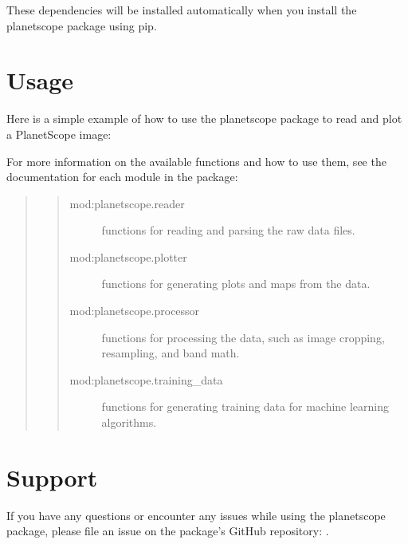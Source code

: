 \documentclass[letterpaper,10pt,english]{sphinxmanual}
\begin{document}
\sphinxAtStartPar
These dependencies will be installed automatically when you install the planetscope package using pip.


\chapter{Usage}
\label{\detokenize{gettingstarted:usage}}
\sphinxAtStartPar
Here is a simple example of how to use the planetscope package to read and plot a PlanetScope image:

\begin{sphinxVerbatim}[commandchars=\\\{\}]
   
   
\end{sphinxVerbatim}

\sphinxAtStartPar
For more information on the available functions and how to use them, see the documentation for each module in the package:
\begin{quote}
\begin{quote}\begin{description}
\item[{mod:planetscope.reader}] \leavevmode
\sphinxAtStartPar
functions for reading and parsing the raw data files.

\item[{mod:planetscope.plotter}] \leavevmode
\sphinxAtStartPar
functions for generating plots and maps from the data.

\item[{mod:planetscope.processor}] \leavevmode
\sphinxAtStartPar
functions for processing the data, such as image cropping, resampling, and band math.

\item[{mod:planetscope.training\_data}] \leavevmode
\sphinxAtStartPar
functions for generating training data for machine learning algorithms.

\end{description}\end{quote}
\end{quote}


\chapter{Support}
\label{\detokenize{gettingstarted:support}}
\sphinxAtStartPar
If you have any questions or encounter any issues while using the planetscope package, please file an issue on the package’s GitHub repository: .
\end{document}
